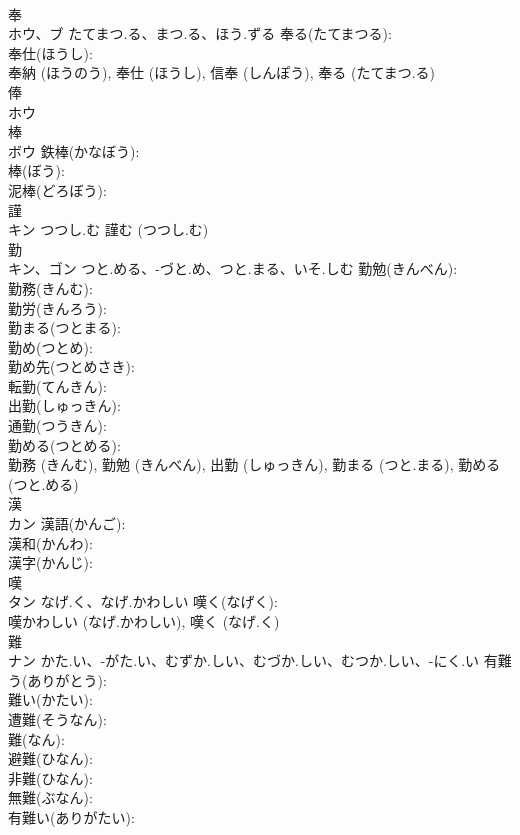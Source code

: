 \documentclass[8pt]{extreport}
\begin{document}
\begin{CJK}{UTF8}{min}
\\	奉			
\\	ホウ、ブ	たてまつ.る、まつ.る、ほう.ずる	奉る(たてまつる): 
\\	奉仕(ほうし): 
\\	奉納 (ほうのう), 奉仕 (ほうし), 信奉 (しんぽう), 奉る (たてまつ.る)
\\	俸			
\\	ホウ			
\\	棒			
\\	ボウ		鉄棒(かなぼう): 
\\	棒(ぼう): 
\\	泥棒(どろぼう): 
\\	謹			
\\	キン	つつし.む		謹む (つつし.む)
\\	勤			
\\	キン、ゴン	つと.める、-づと.め、つと.まる、いそ.しむ	勤勉(きんべん): 
\\	勤務(きんむ): 
\\	勤労(きんろう): 
\\	勤まる(つとまる): 
\\	勤め(つとめ): 
\\	勤め先(つとめさき): 
\\	転勤(てんきん): 
\\	出勤(しゅっきん): 
\\	通勤(つうきん): 
\\	勤める(つとめる): 
\\	勤務 (きんむ), 勤勉 (きんべん), 出勤 (しゅっきん), 勤まる (つと.まる), 勤める (つと.める)
\\	漢			
\\	カン		漢語(かんご): 
\\	漢和(かんわ): 
\\	漢字(かんじ): 
\\	嘆			
\\	タン	なげ.く、なげ.かわしい	嘆く(なげく): 
\\	嘆かわしい (なげ.かわしい), 嘆く (なげ.く)
\\	難			
\\	ナン	かた.い、-がた.い、むずか.しい、むづか.しい、むつか.しい、-にく.い	有難う(ありがとう): 
\\	難い(かたい): 
\\	遭難(そうなん): 
\\	難(なん): 
\\	避難(ひなん): 
\\	非難(ひなん): 
\\	無難(ぶなん): 
\\	有難い(ありがたい): 

\end{CJK}
\end{document}
